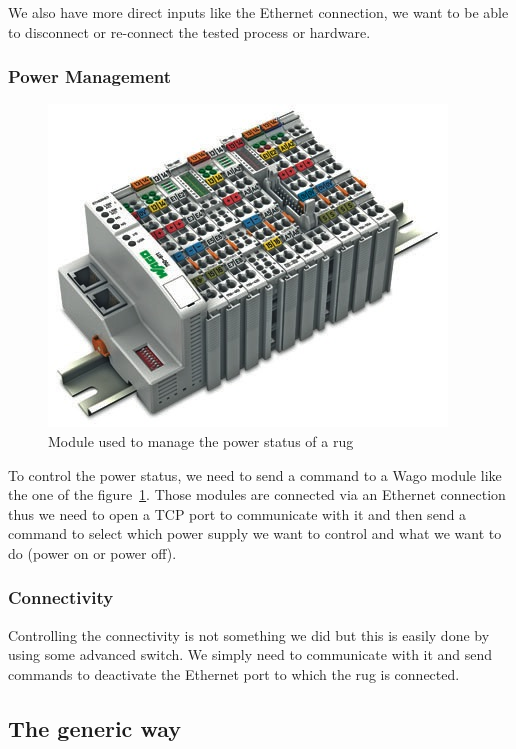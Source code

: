 \documentclass[12pt]{article}
\theoremstyle{definition}
\theoremstyle{definition}
\begin{document}
We also have more direct inputs like the Ethernet connection, we want to be able to disconnect or re-connect the tested process or hardware.

\subsubsection{Power Management}

\begin{figure}
    \centering
    \includegraphics[scale=0.6]{wago_module}
    \caption{Module used to manage the power status of a \gls{rug}}
    \label{wago}
\end{figure}

To control the power status, we need to send a command to a Wago module like the one of the figure~\ref{wago}. Those modules are connected via an Ethernet connection thus we need to open a TCP port to communicate with it and then send a command to select which power supply we want to control and what we want to do (power on or power off).

\subsubsection{Connectivity}

Controlling the connectivity is not something we did but this is easily done by using some advanced switch. We simply need to communicate with it and send commands to deactivate the Ethernet port to which the \gls{rug} is connected.

\subsection{The generic way}
\end{document}
